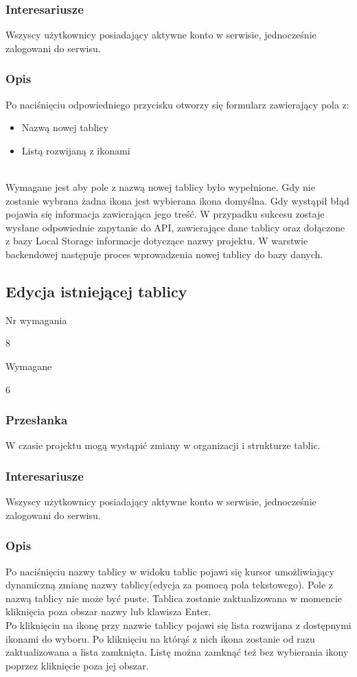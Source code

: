 \documentclass[eng,printmode]{mgr}
\begin{document}
\subsubsection{Interesariusze}
Wszyscy użytkownicy posiadający aktywne konto w serwisie, jednocześnie zalogowani do serwisu.

\subsubsection{Opis}
Po naciśnięciu odpowiedniego przycisku otworzy się formularz zawierający pola z:
\begin{itemize}
  \item[--] Nazwą nowej tablicy
  \item[--] Listą rozwijaną z ikonami
\end{itemize}
\ \\
Wymagane jest aby pole z nazwą nowej tablicy było wypełnione. Gdy nie zostanie wybrana żadna ikona jest wybierana ikona domyślna. Gdy wystąpił błąd pojawia się informacja zawierająca jego treść. W przypadku sukcesu zostaje wysłane odpowiednie zapytanie do API, zawierające dane tablicy oraz dołączone z bazy Local Storage informacje dotyczące nazwy projektu. W warstwie backendowej następuje proces wprowadzenia nowej tablicy do bazy danych.
\newpage

\subsection{Edycja istniejącej tablicy}
\begin{labeling}{Nr wymagania}
\item [Nr wymagania:] 8
\item [Priorytet:] Wymagane
\item [Powiązania:] 6
\end{labeling}

\subsubsection{Przesłanka}
W czasie projektu mogą wystąpić zmiany w organizacji i strukturze tablic.

\subsubsection{Interesariusze}
Wszyscy użytkownicy posiadający aktywne konto w serwisie, jednocześnie zalogowani do serwisu.

\subsubsection{Opis}
Po naciśnięciu nazwy tablicy w widoku tablic pojawi się kursor umożliwiający dynamiczną zmianę nazwy tablicy(edycja za pomocą pola tekstowego). Pole z nazwą tablicy nie może być puste. Tablica zostanie zaktualizowana w momencie kliknięcia poza obszar nazwy lub klawisza Enter.
\\
Po kliknięciu na ikonę przy nazwie tablicy pojawi się lista rozwijana z dostępnymi ikonami do wyboru. Po kliknięciu na którąś z nich ikona zostanie od razu zaktualizowana a lista zamknięta. Listę można zamknąć też bez wybierania ikony poprzez kliknięcie poza jej obszar.
\newpage
\end{document}
